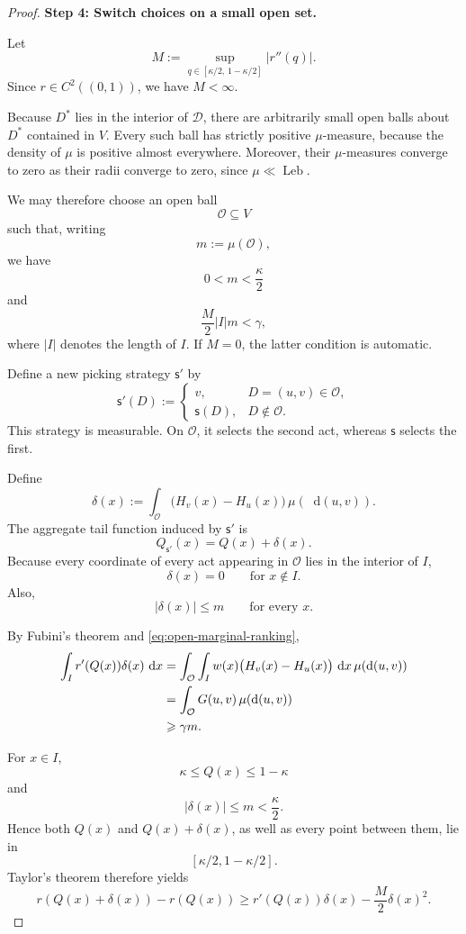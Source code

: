 \documentclass[a4paper,final]{article}
\newcommand{\Decs}{\mathcal{D}}
\newcommand\s{\mathsf{s}}
\newcommand*\diff{\mathop{}\!\mathrm{d}}
\renewcommand{\leq}{\leqslant}
\renewcommand{\geq}{\geqslant}
\newenvironment{CCM rewritten}
{\begingroup\color{blue}} %
{\endgroup}              %
\begin{document}
\begin{proof}
\medskip
\noindent
\textbf{Step 4: Switch choices on a small open set.}

Let
\[
M
:=
\sup_{q\in[\kappa/2,\,1-\kappa/2]}
|r''(q)|.
\]
Since \(r\in C^2((0,1))\), we have \(M<\infty\).

Because \(D^*\) lies in the interior of \(\Decs\), there are arbitrarily
small open balls about \(D^*\) contained in \(V\). Every such ball has
strictly positive \(\mu\)-measure, because the density of \(\mu\) is
positive almost everywhere. Moreover, their \(\mu\)-measures converge
to zero as their radii converge to zero, since
\(\mu\ll\operatorname{Leb}\).

We may therefore choose an open ball
\[
\mathcal O\subseteq V
\]
such that, writing
\[
m:=\mu(\mathcal O),
\]
we have
\[
0<m<\frac{\kappa}{2}
\]
and
\begin{equation}
\frac{M}{2}|I|m<\gamma,
\label{eq:small-ball-condition}
\end{equation}
where \(|I|\) denotes the length of \(I\). If \(M=0\), the latter
condition is automatic.

Define a new picking strategy \(\s'\) by
\[
\s'(D)
:=
\begin{cases}
v,
&
D=(u,v)\in\mathcal O,\\
\s(D),
&
D\notin\mathcal O.
\end{cases}
\]
This strategy is measurable. On \(\mathcal O\), it selects the second
act, whereas \(\s\) selects the first.

Define
\[
\delta(x)
:=
\int_{\mathcal O}
\bigl(H_v(x)-H_u(x)\bigr)
\,\mu(\diff(u,v)).
\]
The aggregate tail function induced by \(\s'\) is
\[
Q_{\s'}(x)=Q(x)+\delta(x).
\]
Because every coordinate of every act appearing in \(\mathcal O\)
lies in the interior of \(I\),
\[
\delta(x)=0
\qquad
\text{for }x\notin I.
\]
Also,
\[
|\delta(x)|\leq m
\qquad
\text{for every }x.
\]

By Fubini's theorem and \eqref{eq:open-marginal-ranking},
\begin{align}
\int_I r'(Q(x))\delta(x)\,\diff x
&=
\int_{\mathcal O}
\int_I
w(x)\bigl(H_v(x)-H_u(x)\bigr)
\,\diff x\,
\mu(\diff(u,v))\notag\\
&=
\int_{\mathcal O}G(u,v)\,\mu(\diff(u,v))\notag\\
&\geq
\gamma m.
\label{eq:linear-gain}
\end{align}

For \(x\in I\),
\[
\kappa\leq Q(x)\leq1-\kappa
\]
and
\[
|\delta(x)|\leq m<\frac{\kappa}{2}.
\]
Hence both \(Q(x)\) and \(Q(x)+\delta(x)\), as well as every point
between them, lie in
\[
[\kappa/2,1-\kappa/2].
\]
Taylor's theorem therefore yields
\[
r(Q(x)+\delta(x))-r(Q(x))
\geq
r'(Q(x))\delta(x)
-\frac{M}{2}\delta(x)^2.
\]


\end{proof}
\end{document}
